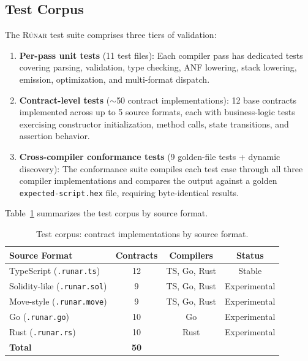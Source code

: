 \documentclass[11pt,a4paper]{article}
\newcommand{\runar}{\textsc{Rúnar}}
\begin{document}
\subsection{Test Corpus}
\label{sec:eval-corpus}

The \runar{} test suite comprises three tiers of validation:

\begin{enumerate}[nosep]
  \item \textbf{Per-pass unit tests} (11 test files): Each compiler pass has
    dedicated tests covering parsing, validation, type checking, ANF lowering,
    stack lowering, emission, optimization, and multi-format dispatch.
  \item \textbf{Contract-level tests} ($\sim$50 contract implementations):
    12 base contracts implemented across up to 5 source formats, each with
    business-logic tests exercising constructor initialization, method calls,
    state transitions, and assertion behavior.
  \item \textbf{Cross-compiler conformance tests} (9 golden-file tests +
    dynamic discovery): The conformance suite compiles each test case through
    all three compiler implementations and compares the output against a
    golden \texttt{expected-script.hex} file, requiring byte-identical results.
\end{enumerate}

Table~\ref{tab:corpus} summarizes the test corpus by source format.

\begin{table}[h]
\centering
\small
\begin{tabular}{@{}lccc@{}}
\toprule
\textbf{Source Format} & \textbf{Contracts} & \textbf{Compilers} & \textbf{Status} \\
\midrule
TypeScript (\texttt{.runar.ts}) & 12 & TS, Go, Rust & Stable \\
Solidity-like (\texttt{.runar.sol}) & 9 & TS, Go, Rust & Experimental \\
Move-style (\texttt{.runar.move}) & 9 & TS, Go, Rust & Experimental \\
Go (\texttt{.runar.go}) & 10 & Go & Experimental \\
Rust (\texttt{.runar.rs}) & 10 & Rust & Experimental \\
\midrule
\textbf{Total} & \textbf{50} & & \\
\bottomrule
\end{tabular}
\caption{Test corpus: contract implementations by source format.}
\label{tab:corpus}
\end{table}
\end{document}
